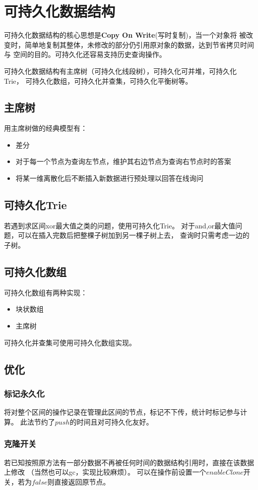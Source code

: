 \section{可持久化数据结构}
可持久化数据结构的核心思想是{\bfseries Copy On Write}(写时复制)，当一个对象将
被改变时，简单地复制其整体，未修改的部分仍引用原对象的数据，达到节省拷贝时间与
空间的目的。可持久化还容易支持历史查询操作。

可持久化数据结构有主席树（可持久化线段树），可持久化可并堆，可持久化Trie，
可持久化数组，可持久化并查集，可持久化平衡树等。
\subsection{主席树}
用主席树做的经典模型有：
\begin{itemize}
    \item 差分
    \item 对于每一个节点为查询左节点，维护其右边节点为查询右节点时的答案
    \item 将某一维离散化后不断插入新数据进行预处理以回答在线询问
\end{itemize}
\subsection{可持久化Trie}
若遇到求区间xor最大值之类的问题，使用可持久化Trie。
对于and,or最大值问题，可以在插入完数后把整棵子树加到另一棵子树上去，
查询时只需考虑一边的子树。
\subsection{可持久化数组}
可持久化数组有两种实现：
\begin{itemize}
    \item 块状数组
    \item 主席树
\end{itemize}
可持久化并查集可使用可持久化数组实现。
\subsection{优化}
\subsubsection{标记永久化}
将对整个区间的操作记录在管理此区间的节点，标记不下传，统计时标记参与计算。
此法节约了$push$的时间且对可持久化友好。
\subsubsection{克隆开关}
若已知按照原方法有一部分数据不再被任何时间的数据结构引用时，直接在该数据上修改
（当然也可以gc，实现比较麻烦）。
可以在操作前设置一个$enableClone$开关，若为$false$则直接返回原节点。

